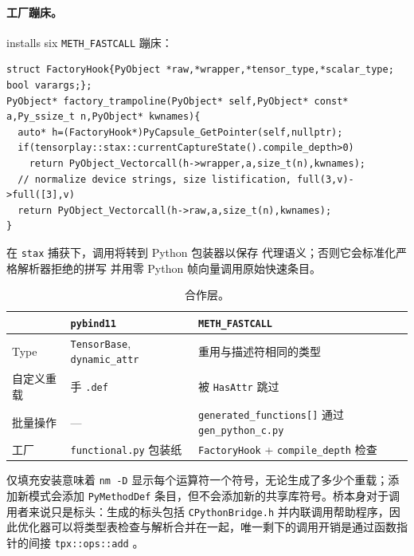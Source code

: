 \paragraph{工厂蹦床。} installs six
\texttt{METH\_FASTCALL} 蹦床：

\begin{lstlisting}[caption={capture-aware trampoline.}, label=lst:factoryhook]
struct FactoryHook{PyObject *raw,*wrapper,*tensor_type,*scalar_type; bool varargs;};
PyObject* factory_trampoline(PyObject* self,PyObject* const* a,Py_ssize_t n,PyObject* kwnames){
  auto* h=(FactoryHook*)PyCapsule_GetPointer(self,nullptr);
  if(tensorplay::stax::currentCaptureState().compile_depth>0)
    return PyObject_Vectorcall(h->wrapper,a,size_t(n),kwnames);
  // normalize device strings, size listification, full(3,v)->full([3],v)
  return PyObject_Vectorcall(h->raw,a,size_t(n),kwnames);
}
\end{lstlisting}

在 \texttt{stax} 捕获下，调用将转到 Python 包装器以保存
代理语义；否则它会标准化严格解析器拒绝的拼写
并用零 Python 帧向量调用原始快速条目。

\begin{table}[H]
\centering
\caption{合作层。}
\label{tab:dualpath}
\small
\begin{tabular}{p{3cm}p{5cm}p{5cm}}
\toprule
  & \texttt{pybind11} & \texttt{METH\_FASTCALL} \\
\midrule
Type & \texttt{TensorBase}, \texttt{dynamic\_attr} & 重用与描述符相同的类型 \\
自定义重载 & 手 \texttt{.def} & 被 \texttt{HasAttr} 跳过 \\
批量操作 & --- & \texttt{generated\_functions[]} 通过 \texttt{gen\_python\_c.py} \\
工厂 & \texttt{functional.py} 包装纸 & \texttt{FactoryHook} + \texttt{compile\_depth} 检查 \\
\bottomrule
\end{tabular}
\end{table}

仅填充安装意味着 \texttt{nm -D} 显示每个运算符一个符号，无论生成了多少个重载；添加新模式会添加 \texttt{PyMethodDef} 条目，但不会添加新的共享库符号。桥本身对于调用者来说只是标头：生成的标头包括 \texttt{CPythonBridge.h} 并内联调用帮助程序，因此优化器可以将类型表检查与解析合并在一起，唯一剩下的调用开销是通过函数指针的间接 \texttt{tpx::ops::add} 。

